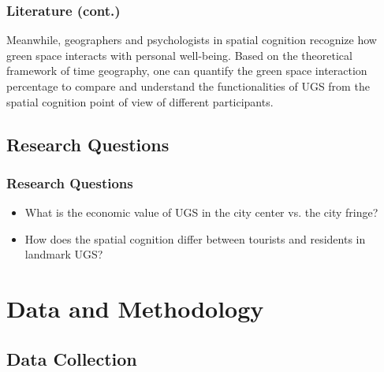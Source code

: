 \documentclass{beamer}
\begin{document}
\begin{frame}
\frametitle{Literature (cont.)}
Meanwhile, geographers and psychologists in \alert{spatial cognition} recognize how green space interacts with personal well-being. Based on the theoretical framework of \alert{time geography}, one can quantify the green space interaction percentage to compare and understand the functionalities of UGS from the spatial cognition point of view of different participants. 
\end{frame}

\subsection{Research Questions}

\begin{frame}
\frametitle{Research Questions}

\begin{itemize}
    \item What is the economic value of UGS in the city center vs. the city fringe?
    \item How does the spatial cognition differ between tourists and residents in landmark UGS?
\end{itemize}

\end{frame}

\section{Data and Methodology}
\subsection{Data Collection}
\end{document}
